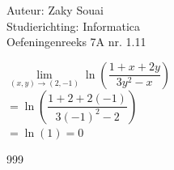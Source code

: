 \documentclass[a4paper]{article}
\begin{document}
  
\noindent \large Auteur: Zaky Souai \\
\noindent \large Studierichting:  Informatica\\
\noindent \large Oefeningenreeks 7A nr. 1.11\\

\bigskip

\normalsize

$ \lim\limits_{(x,y)\rightarrow(2,-1)} \ln\left(\dfrac{1+x+2y}{3y^2-x}\right) $\\

$ = \ln\left(\dfrac{1+2+2(-1)}{3(-1)^2-2}\right) $\\

$ = \ln(1) = 0 $\\


\begin{thebibliography}{999}
\end{thebibliography}
\end{document}
